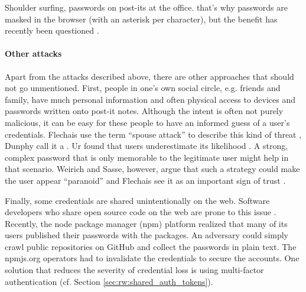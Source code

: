 Shoulder surfing, passwords on post-its at the office. that's why passwords are masked in the browser (with an asterisk per character), but the benefit has recently been questioned \cite{Sasse2016DebunkingMyths}. 



\paragraph{Other attacks} 
Apart from the attacks described above, there are other approaches that should not go unmentioned. First, people in one's own social circle, e.g. friends and family, have much personal information and often physical access to devices and passwords written onto post-it notes. Although the intent is often not purely malicious, it can be easy for these people to have an informed guess of a user's credentials. Flechais \etal use the term ``spouse attack'' to describe this kind of threat \cite{Flechais2013SaudiArabiaTrust}, Dunphy \etal call it a . Ur \etal found that users underestimate its likelihood \cite{Ur2016PerceptionsPassword}. A strong, complex password that is only memorable to the legitimate user might help in that scenario. Weirich and Sasse, however, argue that such a strategy could make the user appear ``paranoid'' \cite{Weirich2001PrettyGoodPersuasion} and Flechais \etal see it as an important sign of trust \cite{Flechais2005DivideConquerTrust, Flechais2013SaudiArabiaTrust}. 
 
Finally, some credentials are shared unintentionally on the web. Software developers who share open source code on the web are prone to this issue \cite{Conklin2004PWAuthenticationSystemPerspective}. Recently, the node package manager (npm) platform realized that many of its users published their passwords with the packages. An adversary could simply crawl public repositories on GitHub and collect the passwords in plain text. The npmjs.org operators had to invalidate the credentials to secure the accounts. One solution that reduces the severity of credential loss is using multi-factor authentication (cf. Section \ref{sec:rw:shared_auth_tokens}).




